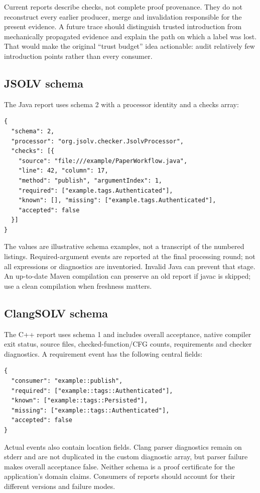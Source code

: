 \documentclass[11pt]{article}
\begin{document}
Current reports describe checks, not complete proof provenance. They do not
reconstruct every earlier producer, merge and invalidation responsible for
the present evidence. A future trace should distinguish trusted introduction
from mechanically propagated evidence and explain the path on which a label
was lost. That would make the original ``trust budget'' idea actionable:
audit relatively few introduction points rather than every consumer.

\subsection{JSOLV schema}
The Java report uses schema 2 with a processor identity and a checks array:
\begin{lstlisting}
{
  "schema": 2,
  "processor": "org.jsolv.checker.JsolvProcessor",
  "checks": [{
    "source": "file:///example/PaperWorkflow.java",
    "line": 42, "column": 17,
    "method": "publish", "argumentIndex": 1,
    "required": ["example.tags.Authenticated"],
    "known": [], "missing": ["example.tags.Authenticated"],
    "accepted": false
  }]
}
\end{lstlisting}
The values are illustrative schema examples, not a transcript of the numbered
listings. Required-argument events are reported at the final processing round;
not all expressions or diagnostics are inventoried. Invalid Java can prevent
that stage. An up-to-date Maven compilation can preserve an old report if
javac is skipped; use a clean compilation when freshness matters.

\subsection{ClangSOLV schema}
The C++ report uses schema 1 and includes overall acceptance, native compiler
exit status, source files, checked-function/CFG counts, requirements and
checker diagnostics. A requirement event has the following central fields:
\begin{lstlisting}
{
  "consumer": "example::publish",
  "required": ["example::tags::Authenticated"],
  "known": ["example::tags::Persisted"],
  "missing": ["example::tags::Authenticated"],
  "accepted": false
}
\end{lstlisting}
Actual events also contain location fields. Clang parser diagnostics remain
on stderr and are not duplicated in the custom diagnostic array, but parser
failure makes overall acceptance false. Neither schema is a proof certificate
for the application's domain claims. Consumers of reports should account
for their different versions and failure modes.
\end{document}
